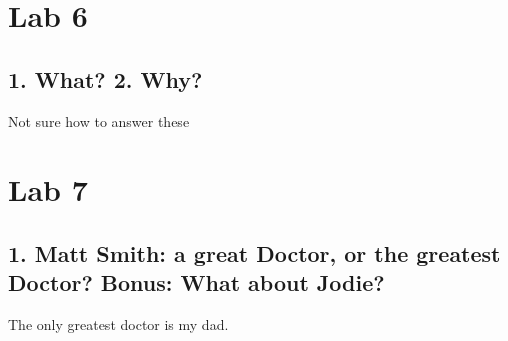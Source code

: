 \documentclass[letterpaper, 10pt,DIV=13]{scrartcl}
\numberwithin{equation}{section} %
\numberwithin{figure}{section} %
\numberwithin{table}{section} %
\begin{document}
\pagebreak


\section{Lab 6}
\subsection{1. What? 2. Why?}
Not sure how to answer these 
\pagebreak

\section{Lab 7}
\subsection{1. Matt Smith: a great Doctor, or the greatest Doctor? Bonus: What about Jodie?}
The only greatest doctor is my dad.
\end{document}
